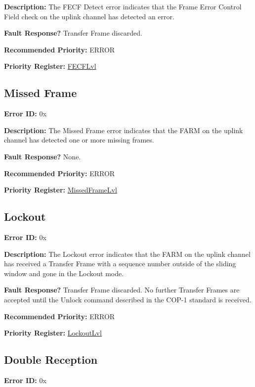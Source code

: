 \documentclass{hitec}
\newcounter{idval}
\newcommand*{\elyid}[0]{0x\padzeroes[2]\Hexadecimal{idval}\addtocounter{idval}{1}}
\begin{document}
\noindent \textbf{Description:} The FECF Detect error indicates that the
Frame Error Control Field check on the uplink channel has 
detected an error.

\noindent \textbf{Fault Response?} Transfer Frame discarded.

\noindent \textbf{Recommended Priority:} ERROR 

\noindent \textbf{Priority Register:} \hyperref[reg:fecflvl]{FECFLvl}

\subsection{Missed Frame}
\label{err:sdlpmissed}

\noindent \textbf{Error ID:} \elyid 

\noindent \textbf{Description:} The Missed Frame error indicates that the FARM
on the uplink channel has detected one or more missing frames.

\noindent \textbf{Fault Response?} None.

\noindent \textbf{Recommended Priority:} ERROR

\noindent \textbf{Priority Register:}
\hyperref[reg:missedframelvl]{MissedFrameLvl}

\subsection{Lockout}
\label{err:sdlplockout}

\noindent \textbf{Error ID:} \elyid 

\noindent \textbf{Description:} The Lockout error indicates that the FARM
on the uplink channel has received a Transfer Frame with a sequence number
outside of the sliding window and gone in the Lockout mode.

\noindent \textbf{Fault Response?} Transfer Frame discarded. No further
Transfer Frames are accepted until the Unlock command described in the COP-1
standard is received.

\noindent \textbf{Recommended Priority:} ERROR

\noindent \textbf{Priority Register:} \hyperref[reg:lockoutlvl]{LockoutLvl}

\subsection{Double Reception}
\label{err:sdlpdouble}

\noindent \textbf{Error ID:} \elyid 
\end{document}
